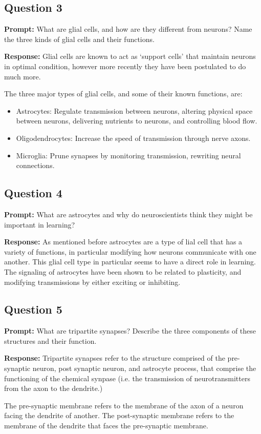 \documentclass{article}
\begin{document}
\subsection*{Question 3}
\noindent\textbf{Prompt:} What are glial cells, and how are they different from neurons? Name the three kinds of glial cells and their functions.
\bigskip

\noindent\textbf{Response:} Glial cells are known to act as `support cells' that maintain neurons in optimal condition, however more recently they have been postulated to do much more.

The three major types of glial cells, and some of their known functions, are:
\begin{itemize}
    \item Astrocytes: Regulate transmission between neurons, altering physical space between neurons, delivering nutrients to neurons, and controlling blood flow.
    \item Oligodendrocytes: Increase the speed of transmission through nerve axons.
    \item Microglia: Prune synapses by monitoring transmission, rewriting neural connections. 
\end{itemize} 

\subsection*{Question 4}
\noindent\textbf{Prompt:} What are astrocytes and why do neuroscientists think they might be important in learning?
\bigskip

\noindent\textbf{Response:} As mentioned before astrocytes are a type of lial cell that has a variety of functions, in particular modifying how neurons communicate with one another. This glial cell type in particular seems to have a direct role in learning. The signaling of astrocytes have been shown to be related to plasticity, and modifying transmissions by either exciting or inhibiting. 

\subsection*{Question 5}
\noindent\textbf{Prompt:} What are tripartite synapses? Describe the three components of these structures and their function.
\bigskip

\noindent\textbf{Response:} Tripartite synapses refer to the structure comprised of the pre-synaptic neuron, post synaptic neuron, and astrocyte process, that comprise the functioning of the chemical synpase (i.e. the transmission of neurotransmitters from the axon to the dendrite.)

The pre-synaptic membrane refers to the membrane of the axon of a neuron facing the dendrite of another. The post-synaptic membrane refers to the membrane of the dendrite that faces the pre-synaptic membrane.
\end{document}
